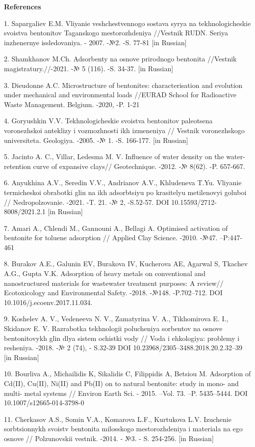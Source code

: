\begin{center}
{\bfseries References}
\end{center}

\begin{noparindent}
1. Sapargaliev E.M. Vliyanie veshchestvennogo sostava
syr\textquotesingle ya na tekhnologicheskie svoistva bentonitov
Taganskogo mestorozhdeniya //Vestnik RUDN. Seriya inzhenernye
issledovaniya. - 2007. -№2. -S. 77-81 {[}in Russian{]}

2. Shamkhanov M.Ch. Adsorbenty na osnove prirodnogo bentonita //Vestnik
magistratury.//-2021. -№ 5 (116). -S. 34-37. {[}in Russian{]}

3. Dieudonne A.C. Microstructure of bentonites: characterisation and
evolution under mechanical and environmental loads //EURAD School for
Radioactive Waste Management. Belgium. -2020, -P. 1-21

4. Goryushkin V.V. Tekhnologicheskie svoistva bentonitov paleotsena
voronezhskoi anteklizy i vozmozhnosti ikh izmeneniya // Vestnik
voronezhskogo universiteta. Geologiya. -2005. -№ 1. -S. 166-177. {[}in
Russian{]}

5. Jacinto A. C., Villar, Ledesma M. V. Influence of water density on
the water-retention curve of expansive clays// Geotechnique. -2012. -№
8(62). -P. 657-667.

6. Anyukhina A.V., Seredin V.V., Andrianov A.V., Khludeneva T.Yu.
Vliyanie termicheskoi obrabotki glin na ikh adsorbtsiyu po krasitelyu
metilenovyi goluboi // Nedropol\textquotesingle zovanie. -2021. -T. 21.
-№ 2, -S.52-57. DOI 10.15593/2712-8008/2021.2.1 {[}in Russian{]}

7. Amari A., Chlendi M., Gannouni A., Bellagi A. Optimised activation of
bentonite for toluene adsorption // Applied Clay Science. -2010. -№47.
--P:447-461

8. Burakov A.E., Galunin EV, Burakova IV, Kucherova AE, Agarwal S,
Tkachev A.G., Gupta V.K. Adsorption of heavy metals on conventional and
nanostructured materials for wastewater treatment purposes: A review//
Ecotoxicology and Environmental Safety. -2018. -№148. -P.702--712. DOI
10.1016/j.ecoenv.2017.11.034.

9. Koshelev A. V., Vedeneeva N. V., Zamatyrina V. A., Tikhomirova E. I.,
Skidanov E. V. Razrabotka tekhnologii polucheniya sorbentov na osnove
bentonitovykh glin dlya sistem ochistki vody // Voda i ehkologiya:
problemy i resheniya. -2018. -№ 2 (74), - S.32-39 DOI
10.23968/2305--3488.2018.20.2.32--39 {[}in Russian{]}

10. Bourliva A., Michailidis K, Sikalidis C, Filippidis A, Betsiou M.
Adsorption of Cd(II), Cu(II), Ni(II) and Pb(II) on to natural bentonite:
study in mono- and multi- metal systems // Environ Earth Sci. - 2015.
--Vol. 73. --P. 5435--5444. DOI 10.1007/s12665-014-3798-0

11. Cherkasov A.S., Somin V.A., Komarova L.F., Kurtukova L.V. Izuchenie
sorbtsionnykh svoistv bentonita milosskogo mestorozhdeniya i materiala
na ego osnove // Polzunovskii vestnik. -2014. - №3. - S. 254-256. {[}in
Russian{]}
\end{noparindent}

